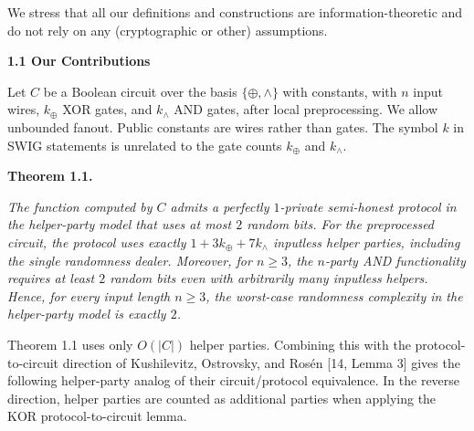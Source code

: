 \documentclass[10pt,a4paper]{article}
\begin{document}
We stress that all our definitions and constructions are information-theoretic and do not rely on any (cryptographic or other) assumptions.\par




\par\medskip\noindent\textbf{
1.1 Our Contributions}\par




Let $C$ be a Boolean circuit over the basis $\{\oplus,\wedge\}$ with constants, with $n$ input wires, $k_{\oplus}$ XOR gates, and $k_{\wedge}$ AND gates, after local preprocessing. We allow unbounded fanout. Public constants are wires rather than gates. The symbol $k$ in SWIG statements is unrelated to the gate counts $k_{\oplus}$ and $k_{\wedge}$.\par






\par\medskip\noindent\textbf{
\textbf{Theorem 1.1}\textbf{.}
}\par



\emph{The function computed by $C$ admits a perfectly $1$-private semi-honest protocol in the helper-party model that uses at most $2$ random bits. For the preprocessed circuit, the protocol uses exactly $1+3k_{\oplus}+7k_{\wedge}$ inputless helper parties, including the single randomness dealer.
Moreover, for $n\geq 3$, the $n$-party AND functionality requires at least $2$ random bits even with arbitrarily many inputless helpers. Hence, for every input length $n\geq 3$, the worst-case randomness complexity in the helper-party model is exactly $2$.}\par







Theorem 1.1 uses only $O(|C|)$ helper parties. Combining this with the protocol-to-circuit direction of Kushilevitz, Ostrovsky, and Rosén [14, Lemma 3] gives the following helper-party analog of their circuit/protocol equivalence. In the reverse direction, helper parties are counted as additional parties when applying the KOR protocol-to-circuit lemma.\par



\end{document}
